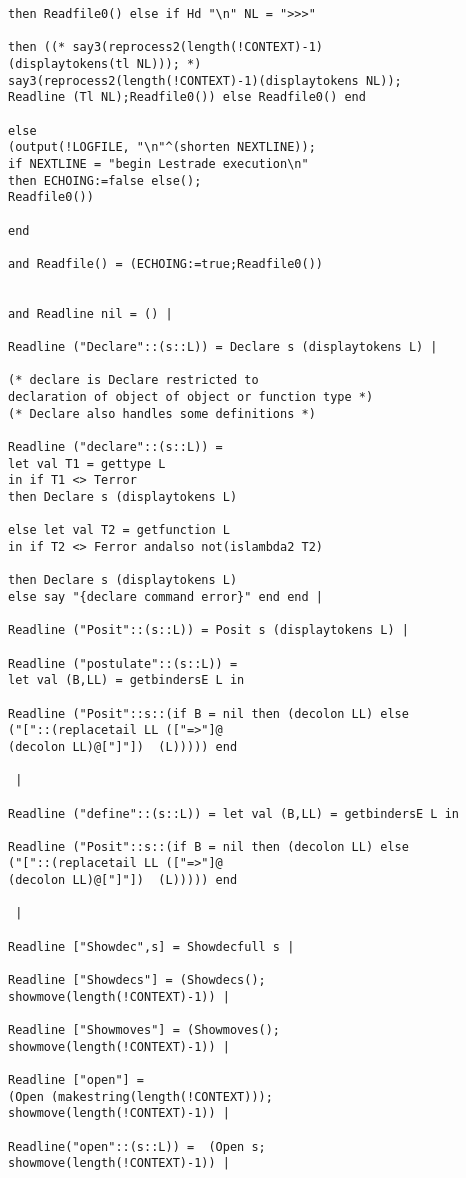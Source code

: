 \documentclass[12pt]{article}
\begin{document}
\begin{verbatim}
then Readfile0() else if Hd "\n" NL = ">>>"

then ((* say3(reprocess2(length(!CONTEXT)-1)
(displaytokens(tl NL))); *)
say3(reprocess2(length(!CONTEXT)-1)(displaytokens NL));
Readline (Tl NL);Readfile0()) else Readfile0() end

else
(output(!LOGFILE, "\n"^(shorten NEXTLINE));
if NEXTLINE = "begin Lestrade execution\n" 
then ECHOING:=false else();
Readfile0())

end

and Readfile() = (ECHOING:=true;Readfile0())


and Readline nil = () |

Readline ("Declare"::(s::L)) = Declare s (displaytokens L) |

(* declare is Declare restricted to 
declaration of object of object or function type *)
(* Declare also handles some definitions *)

Readline ("declare"::(s::L)) = 
let val T1 = gettype L 
in if T1 <> Terror 
then Declare s (displaytokens L)
                               
else let val T2 = getfunction L 
in if T2 <> Ferror andalso not(islambda2 T2)
							   
then Declare s (displaytokens L) 
else say "{declare command error}" end end |

Readline ("Posit"::(s::L)) = Posit s (displaytokens L) |

Readline ("postulate"::(s::L)) = 
let val (B,LL) = getbindersE L in

Readline ("Posit"::s::(if B = nil then (decolon LL) else
("["::(replacetail LL (["=>"]@
(decolon LL)@["]"])  (L))))) end

 |
		  
Readline ("define"::(s::L)) = let val (B,LL) = getbindersE L in
         
Readline ("Posit"::s::(if B = nil then (decolon LL) else
("["::(replacetail LL (["=>"]@
(decolon LL)@["]"])  (L))))) end

 |

Readline ["Showdec",s] = Showdecfull s |

Readline ["Showdecs"] = (Showdecs();
showmove(length(!CONTEXT)-1)) |

Readline ["Showmoves"] = (Showmoves();
showmove(length(!CONTEXT)-1)) |

Readline ["open"] = 
(Open (makestring(length(!CONTEXT)));
showmove(length(!CONTEXT)-1)) |

Readline("open"::(s::L)) =  (Open s;
showmove(length(!CONTEXT)-1)) |


\end{verbatim}
\end{document}
